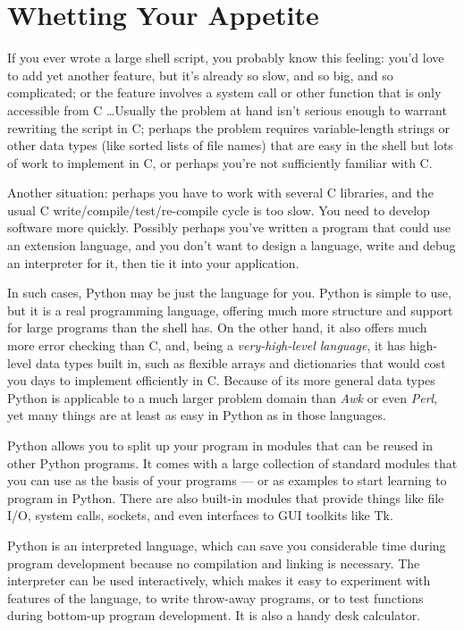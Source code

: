 \documentclass{manual}
\begin{document}
\tableofcontents


\chapter{Whetting Your Appetite \label{intro}}

If you ever wrote a large shell script, you probably know this
feeling: you'd love to add yet another feature, but it's already so
slow, and so big, and so complicated; or the feature involves a system
call or other function that is only accessible from C \ldots Usually
the problem at hand isn't serious enough to warrant rewriting the
script in C; perhaps the problem requires variable-length strings or
other data types (like sorted lists of file names) that are easy in
the shell but lots of work to implement in C, or perhaps you're not
sufficiently familiar with C.

Another situation: perhaps you have to work with several C libraries,
and the usual C write/compile/test/re-compile cycle is too slow.  You
need to develop software more quickly.  Possibly perhaps you've
written a program that could use an extension language, and you don't
want to design a language, write and debug an interpreter for it, then
tie it into your application.

In such cases, Python may be just the language for you.  Python is
simple to use, but it is a real programming language, offering much
more structure and support for large programs than the shell has.  On
the other hand, it also offers much more error checking than C, and,
being a \emph{very-high-level language}, it has high-level data types
built in, such as flexible arrays and dictionaries that would cost you
days to implement efficiently in C.  Because of its more general data
types Python is applicable to a much larger problem domain than
\emph{Awk} or even \emph{Perl}, yet many things are at least as easy
in Python as in those languages.

Python allows you to split up your program in modules that can be
reused in other Python programs.  It comes with a large collection of
standard modules that you can use as the basis of your programs --- or
as examples to start learning to program in Python.  There are also
built-in modules that provide things like file I/O, system calls,
sockets, and even interfaces to GUI toolkits like Tk.  

Python is an interpreted language, which can save you considerable time
during program development because no compilation and linking is
necessary.  The interpreter can be used interactively, which makes it
easy to experiment with features of the language, to write throw-away
programs, or to test functions during bottom-up program development.
It is also a handy desk calculator.
\end{document}
